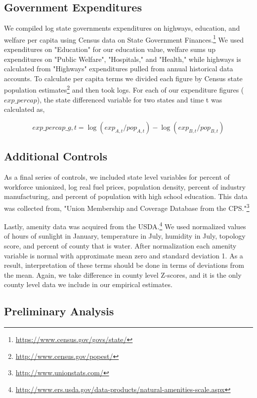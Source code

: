 \subsection{Government Expenditures}

We compiled log state governments expenditures on highways, education, and welfare per capita using Census data on State Government Finances.\footnote{\url{https://www.census.gov/govs/state/}} We used expenditures on "Education" for our education value, welfare sums up expenditures on "Public Welfare", "Hospitals," and "Health," while highways is calculated from "Highways" expenditures pulled from annual historical data accounts. To calculate per capita terms we divided each figure by Census state population estimates\footnote{\url{http://www.census.gov/popest/}} and then took logs. For each of our expenditure figures ($exp\_percap$), the state differenced variable for two states and time t was calculated as,

\begin{equation} exp\_percap\_{g,t} = \log(exp_{A,t}/pop_{A,t}) - \log(exp_{B,t}/pop_{B,t}) \end{equation}

\subsection{Additional Controls}

As a final series of controls, we included state level variables for percent of workforce unionized, log real fuel prices, population density, percent of industry manufacturing, and percent of population with high school education. This data was collected from, "Union Membership and Coverage Database from the CPS."\footnote{\url{http://www.unionstats.com/}}

Lastly, amenity data was acquired from the USDA.\footnote{\url{http://www.ers.usda.gov/data-products/natural-amenities-scale.aspx}} We used normalized values of hours of sunlight in January, temperature in July, humidity in July, topology score, and percent of county that is water. After normalization each amenity variable is normal with approximate mean zero and standard deviation 1. As a result, interpretation of these terms should be done in terms of deviations from the mean. Again, we take difference in county level Z-scores, and it is the only county level data we include in our empirical estimates.

\subsection{Preliminary Analysis}

